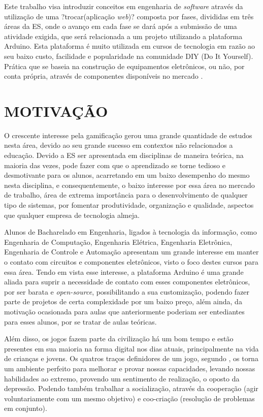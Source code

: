 Este trabalho visa introduzir conceitos em engenharia de \textit{software} através da utilização de uma ?trocar(aplicação \textit{web})? composta por fases, divididas em três áreas da ES, onde o avanço em cada fase se dará após a submissão de uma atividade exigida, que será relacionada a um projeto utilizando a plataforma Arduino. Esta plataforma é muito utilizada em cursos de tecnologia em razão ao seu baixo custo, facilidade e popularidade na comunidade DIY (Do It Yourself). Prática que se baseia na construção de equipamentos eletrônicos, ou não, por conta própria, através de componentes disponíveis no mercado \cite{Kuznetsov2010}.



\section{MOTIVAÇÃO}
\label{sec:motivacao}


O crescente interesse pela gamificação gerou uma grande quantidade de estudos nesta área, devido ao seu grande sucesso em contextos não relacionados a educação. Devido a ES ser apresentada em disciplinas de maneira teórica, na maioria das vezes, pode fazer com que o aprendizado se torne tedioso e desmotivante para os alunos, acarretando em um baixo desempenho do mesmo nesta disciplina, e consequentemente, o baixo interesse por essa área no mercado de trabalho, área de extrema importância para o desenvolvimento de qualquer tipo de sistemas, por fomentar produtividade, organização e qualidade, aspectos que qualquer empresa de tecnologia almeja.

Alunos de Bacharelado em Engenharia, ligados à tecnologia da informação, como Engenharia de Computação, Engenharia Elétrica, Engenharia Eletrônica, Engenharia de Controle e Automação apresentam um grande interesse em manter o contato com circuitos e componentes eletrônicos, visto o foco destes cursos para essa área. Tendo em vista esse interesse, a plataforma Arduino é uma grande aliada para suprir a necessidade de contato com esses componentes eletrônicos, por ser barata e \textit{open-source}, possibilitando a sua customização, podendo fazer parte de projetos de certa complexidade por um baixo preço, além ainda, da motivação ocasionada para aulas que anteriormente poderiam ser entediantes para esses alunos, por se tratar de aulas teóricas.

Além disso, os jogos fazem parte da civilização há um bom tempo \cite{Borges2014} e estão presentes em sua maioria na forma digital nos dias atuais, principalmente na vida de crianças e jovens. Os quatros traços definidores de um jogo, segundo \cite{McGonigal2011}, os torna um ambiente perfeito para melhorar e provar nossas capacidades, levando nossas habilidades ao extremo, provendo um sentimento de realização, o oposto da depressão. Podendo também trabalhar a socialização, através da  cooperação (agir voluntariamente com um mesmo objetivo) e coo-criação (resolução de problemas em conjunto).
  



